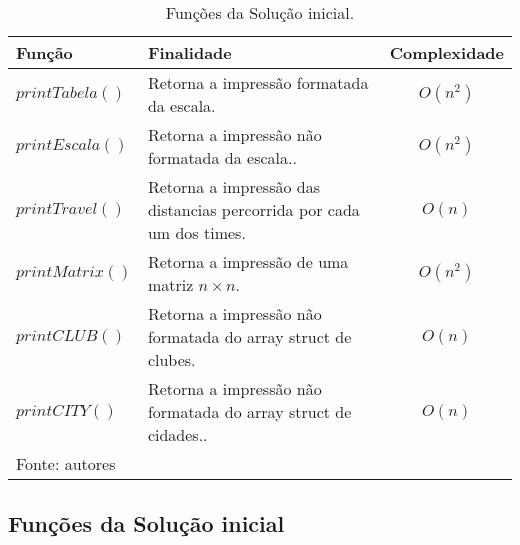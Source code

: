 \documentclass[12pt,a4paper]{article}
\begin{document}
\begin{table}[H]
	\renewcommand{\arraystretch}{1}
	\centering
	\caption{Funções da Solução inicial.}
	\label{tab:print}
	\begin{tabular}{p{2.7cm} p{9.5cm} c}
		\toprule 
		Função & Finalidade & Complexidade \\ 
		\midrule
		$printTabela()$ & Retorna a impressão formatada da escala. & $O(n^2)$ \\
		$printEscala()$ & Retorna a impressão não formatada da escala.. & $O(n^2)$ \\
		$printTravel()$ & Retorna a impressão das distancias percorrida por cada um dos times. & $O(n)$ \\
		$printMatrix()$ & Retorna a impressão de uma matriz $n \times n$. & $O(n^2)$ \\
		$printCLUB()$ & Retorna a impressão não formatada do array struct de clubes. & $O(n)$ \\
		$printCITY()$ & Retorna a impressão não formatada do array struct de cidades.. & $O(n)$ \\
		\bottomrule
		\footnotesize Fonte: autores
	\end{tabular}
\end{table}

\subsection{Funções da Solução inicial}
\end{document}
